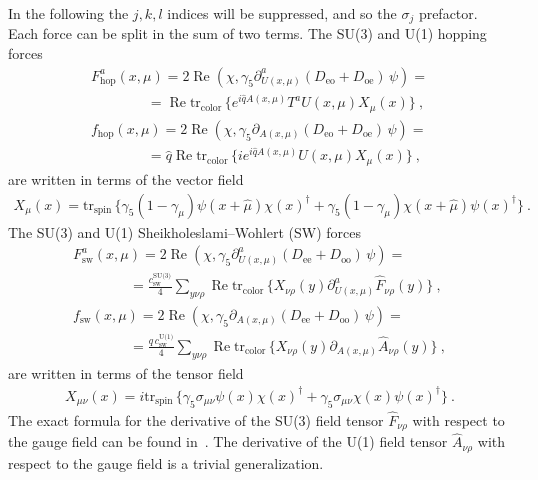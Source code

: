 \documentclass[11pt,fleqn]{article}
\renewcommand{\Re}[0]{\operatorname{Re}}
\begin{document}
In the following the $j,k,l$ indices will be suppressed, and so the $\sigma_j$ prefactor. Each force can be split in the sum of two terms. The SU(3) and U(1) hopping forces
\begin{gather}
   F_\text{hop}^a(x,\mu)
   =
   2 \Re ( \chi, \gamma_5 \partial_{U(x,\mu)}^a (D_\text{eo} + D_\text{oe}) \, \psi )
   = \nonumber \\ \qquad \qquad =
   \Re \text{tr}_\text{color} \, \{ e^{i \hat{q} A(x,\mu)} T^a U(x,\mu) X_\mu(x) \}
   \ , \\
   f_\text{hop}(x,\mu)
   =
   2 \Re ( \chi, \gamma_5 \partial_{A(x,\mu)} (D_\text{eo} + D_\text{oe}) \, \psi )
   = \nonumber \\ \qquad \qquad =
   \hat{q} \Re \text{tr}_\text{color} \, \{ i e^{i \hat{q} A(x,\mu)} U(x,\mu) X_\mu(x) \}
   \ ,
\end{gather}
are written in terms of the vector field
\begin{gather}
   X_\mu(x) = \text{tr}_\text{spin} \, \{ \gamma_5 (1-\gamma_\mu) \psi(x+\hat{\mu}) \chi(x)^\dag + \gamma_5 (1-\gamma_\mu) \chi(x+\hat{\mu}) \psi(x)^\dag \} \ .
\end{gather}
The SU(3) and U(1) Sheikholeslami–Wohlert (SW) forces
\begin{gather}
   F_\text{sw}^a(x,\mu)
   =
   2 \Re ( \chi, \gamma_5 \partial_{U(x,\mu)}^a (D_\text{ee} + D_\text{oo}) \, \psi )
   = \nonumber \\ \qquad \qquad =
   \frac{c^\text{SU(3)}_\text{sw}}{4} \sum_{y\nu\rho} \Re \text{tr}_\text{color} \, \{ X_{\nu\rho}(y) \partial_{U(x,\mu)}^a \widehat{F}_{\nu\rho}(y) \}
   \ , \\
   f_\text{sw}(x,\mu)
   =
   2 \Re ( \chi, \gamma_5 \partial_{A(x,\mu)} (D_\text{ee} + D_\text{oo}) \, \psi )
   = \nonumber \\ \qquad \qquad =
   \frac{q\, c^\text{U(1)}_\text{sw}}{4} \sum_{y\nu\rho} \Re \text{tr}_\text{color} \, \{ X_{\nu\rho}(y) \partial_{A(x,\mu)} \widehat{A}_{\nu\rho}(y) \}
   \ ,
\end{gather}
are written in terms of the tensor field
\begin{gather}
   X_{\mu\nu}(x) = i \text{tr}_\text{spin} \, \{ \gamma_5 \sigma_{\mu\nu} \psi(x) \chi(x)^\dag + \gamma_5 \sigma_{\mu\nu} \chi(x) \psi(x)^\dag \}
   \ .
\end{gather}
The exact formula for the derivative of the SU(3) field tensor $\widehat{F}_{\nu\rho}$ with respect to the gauge field can be found in~\cite{openQCD:forces}. The derivative of the U(1) field tensor $\widehat{A}_{\nu\rho}$ with respect to the gauge field is a trivial generalization.
\end{document}
